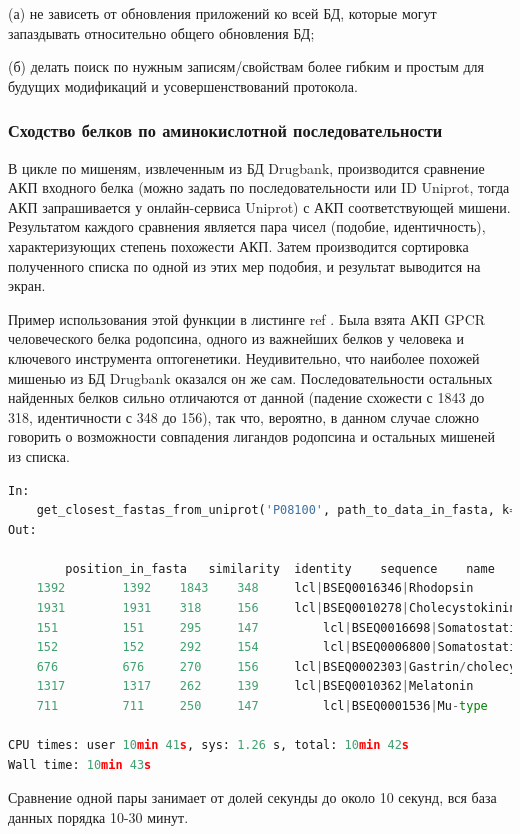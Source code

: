 \documentclass[a4paper,14pt]{article}         %
\newcommand{\sic}[1]{\LARGE\color{orange}{#1}\color{black}\Large}
\begin{document}
(а) не зависеть от обновления приложений ко всей БД, которые могут запаздывать относительно общего обновления БД; 

(б) делать поиск по нужным записям/свойствам более гибким и простым для будущих модификаций и усовершенствований протокола.

\subsubsection{Сходство белков по аминокислотной последовательности}

В цикле по мишеням, извлеченным из БД Drugbank, производится сравнение АКП входного белка (можно задать по последовательности или ID Uniprot, тогда АКП запрашивается у онлайн-сервиса Uniprot) с АКП соответствующей мишени. Результатом каждого сравнения является пара чисел (подобие, идентичность), характеризующих степень похожести АКП. Затем производится сортировка полученного списка по одной из этих мер подобия, и результат выводится на экран.

Пример использования этой функции в листинге \color{orange} ref
\color{black}. Была взята АКП GPCR человеческого белка родопсина, одного из важнейших белков у человека и ключевого инструмента оптогенетики. Неудивительно, что наиболее похожей мишенью из БД Drugbank оказался он же сам. Последовательности остальных найденных белков сильно отличаются от данной (падение схожести с 1843 до 318, идентичности с 348 до 156), \sic{Почему нет GPCR?} так что, вероятно, в данном случае сложно говорить о возможности совпадения лигандов родопсина и остальных мишеней из списка.
\begin{lstlisting}[language=Python, caption={Определение сходства мишеней по а/к последовательности посредством Biopython, входные данные --- ID Uniptor человеческого родопсина из семейства GPCR.}]
In:
	get_closest_fastas_from_uniprot('P08100', path_to_data_in_fasta, k=0, align_matrix='blosum62', sim_or_ident=True)
Out:

	 	position_in_fasta 	similarity 	identity 	sequence 	name
	1392 	 	1392 	1843 	348  	lcl|BSEQ0016346|Rhodopsin
	1931 	 	1931 	318 	156 	lcl|BSEQ0010278|Cholecystokinin
	151 	 	151 	295 	147 		lcl|BSEQ0016698|Somatostatin
	152 	 	152 	292 	154 		lcl|BSEQ0006800|Somatostatin
	676 	 	676 	270 	156 	lcl|BSEQ0002303|Gastrin/cholecystokinin
	1317 	 	1317 	262 	139 	lcl|BSEQ0010362|Melatonin
	711 	 	711 	250 	147 		lcl|BSEQ0001536|Mu-type

CPU times: user 10min 41s, sys: 1.26 s, total: 10min 42s
Wall time: 10min 43s
\end{lstlisting}
Сравнение одной пары занимает от долей секунды до около 10 секунд, вся база данных порядка 10-30 минут.
\end{document}
